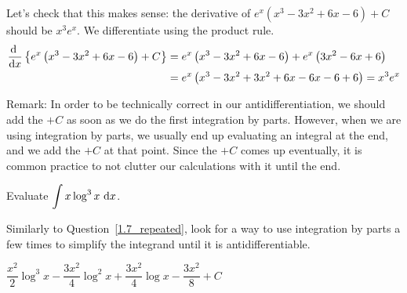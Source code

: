 \begin{solution}
Let's check that this makes sense: the derivative of $e^x\left(x^3-3x^2+6x - 6\right)+C$ should be $x^3e^x$. We differentiate using the product rule.
\begin{align*}
\diff{}{x}\left\{e^x\left(x^3-3x^2+6x - 6\right)+C\right\}
&=e^x\left(x^3-3x^2+6x - 6\right)+e^x\left(3x^2-6x+6\right)\\
&=e^x\left(x^3-3x^2+3x^2+6x-6x-6+6\right)=x^3e^x
\end{align*}

Remark: In order to be technically correct in our antidifferentiation, we should add the $+C$ as soon as we do the first integration by parts. However, when we are using integration by parts, we usually end up evaluating an integral at the end, and we add the $+C$ at that point. Since the $+C$ comes up eventually, it is common practice to not clutter our calculations with it until the end.
\end{solution}
\begin{question}
Evaluate $\displaystyle\int x \log^3 x~ \mathrm{d}x$.
\end{question}
\begin{hint}
Similarly to Question~\ref{1.7_repeated}, look for a way to use integration by parts a few times to simplify the integrand until it is antidifferentiable.
\end{hint}
\begin{answer}
$\dfrac{x^2}{2}\log^3x -
\dfrac{3x^2}{4}\log^2 x + \dfrac{3x^2}{4}\log x
 - \dfrac{3x^2}{8}+C$
\end{answer}
